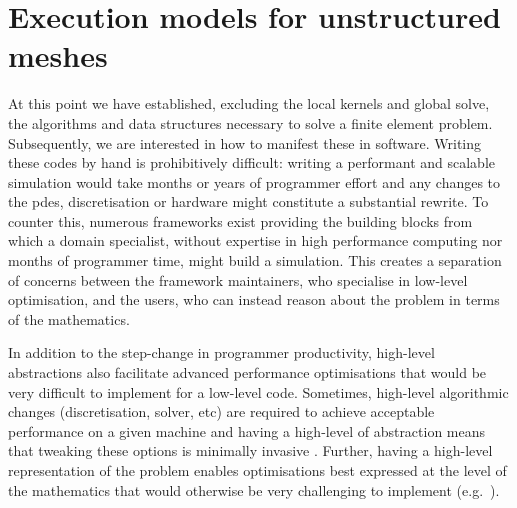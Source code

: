 \documentclass[thesis]{subfiles}
\begin{document}


\section{Execution models for unstructured meshes}

At this point we have established, excluding the local kernels and global solve, the algorithms and data structures necessary to solve a finite element problem.
Subsequently, we are interested in how to manifest these in software.
Writing these codes by hand is prohibitively difficult: writing a performant and scalable simulation would take months or years of programmer effort and any changes to the \glspl{pde}, discretisation or hardware might constitute a substantial rewrite.
To counter this, numerous frameworks exist providing the building blocks from which a domain specialist, without expertise in high performance computing nor months of programmer time, might build a simulation.
This creates a separation of concerns between the framework maintainers, who specialise in low-level optimisation, and the users, who can instead reason about the problem in terms of the mathematics.

In addition to the step-change in programmer productivity, high-level abstractions also facilitate advanced performance optimisations that would be very difficult to implement for a low-level code.
Sometimes, high-level algorithmic changes (discretisation, solver, etc) are required to achieve acceptable performance on a given machine and having a high-level of abstraction means that tweaking these options is minimally invasive \parencite{betteridgeCodeGenerationProductive2021}.
Further, having a high-level representation of the problem enables optimisations best expressed at the level of the mathematics that would otherwise be very challenging to implement (e.g.~\cite{homolyaExposingExploitingStructure2017}).
\end{document}
